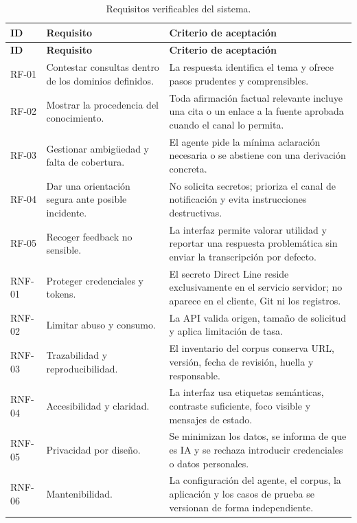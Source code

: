 \documentclass[12pt,twoside,titlepage]{book}
\begin{document}
\begin{longtable}{p{}p{}p{}}
\caption{Requisitos verificables del sistema.}\label{tab:requisitos}\\
\toprule
\textbf{ID} & \textbf{Requisito} & \textbf{Criterio de aceptaci\'on}\\
\midrule
\endfirsthead
\toprule
\textbf{ID} & \textbf{Requisito} & \textbf{Criterio de aceptaci\'on}\\
\midrule
\endhead
RF-01 & Contestar consultas dentro de los dominios definidos. & La respuesta identifica el tema y ofrece pasos prudentes y comprensibles.\\
RF-02 & Mostrar la procedencia del conocimiento. & Toda afirmaci\'on factual relevante incluye una cita o un enlace a la fuente aprobada cuando el canal lo permita.\\
RF-03 & Gestionar ambig\"uedad y falta de cobertura. & El agente pide la m\'inima aclaraci\'on necesaria o se abstiene con una derivaci\'on concreta.\\
RF-04 & Dar una orientaci\'on segura ante posible incidente. & No solicita secretos; prioriza el canal de notificaci\'on y evita instrucciones destructivas.\\
RF-05 & Recoger feedback no sensible. & La interfaz permite valorar utilidad y reportar una respuesta problem\'atica sin enviar la transcripci\'on por defecto.\\
RNF-01 & Proteger credenciales y tokens. & El secreto Direct Line reside exclusivamente en el servicio servidor; no aparece en el cliente, Git ni los registros.\\
RNF-02 & Limitar abuso y consumo. & La API valida origen, tama\~no de solicitud y aplica limitaci\'on de tasa.\\
RNF-03 & Trazabilidad y reproducibilidad. & El inventario del corpus conserva URL, versi\'on, fecha de revisi\'on, huella y responsable.\\
RNF-04 & Accesibilidad y claridad. & La interfaz usa etiquetas sem\'anticas, contraste suficiente, foco visible y mensajes de estado.\\
RNF-05 & Privacidad por dise\~no. & Se minimizan los datos, se informa de que es IA y se rechaza introducir credenciales o datos personales.\\
RNF-06 & Mantenibilidad. & La configuraci\'on del agente, el corpus, la aplicaci\'on y los casos de prueba se versionan de forma independiente.\\
\bottomrule
\end{longtable}
\end{document}
